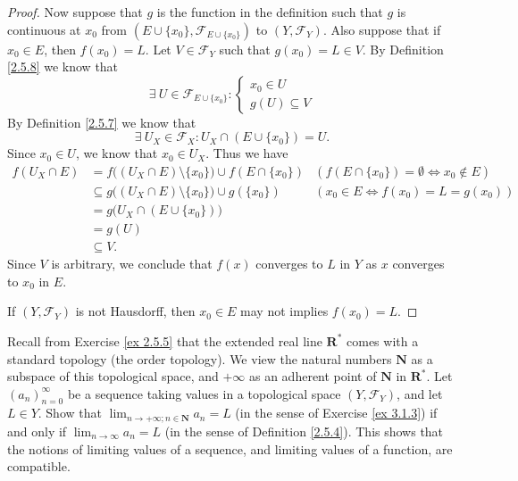 \begin{proof}
    Now suppose that \(g\) is the function in the definition such that \(g\) is continuous at \(x_0\) from \((E \cup \{x_0\}, \mathcal{F}_{E \cup \{x_0\}})\) to \((Y, \mathcal{F}_Y)\).
    Also suppose that if \(x_0 \in E\), then \(f(x_0) = L\).
    Let \(V \in \mathcal{F}_Y\) such that \(g(x_0) = L \in V\).
    By Definition \ref{2.5.8} we know that
    \[
        \exists\ U \in \mathcal{F}_{E \cup \{x_0\}} : \begin{cases}
            x_0 \in U \\
            g(U) \subseteq V
        \end{cases}
    \]
    By Definition \ref{2.5.7} we know that
    \[
        \exists\ U_X \in \mathcal{F}_X : U_X \cap (E \cup \{x_0\}) = U.
    \]
    Since \(x_0 \in U\), we know that \(x_0 \in U_X\).
    Thus we have
    \begin{align*}
        f(U_X \cap E) & = f\big((U_X \cap E) \setminus \{x_0\}\big) \cup f(E \cap \{x_0\})  & (f(E \cap \{x_0\}) = \emptyset \iff x_0 \notin E) \\
                      & \subseteq g\big((U_X \cap E) \setminus \{x_0\}\big) \cup g(\{x_0\}) & (x_0 \in E \iff f(x_0) = L = g(x_0))              \\
                      & = g\big(U_X \cap (E \cup \{x_0\})\big)                                                                                  \\
                      & = g(U)                                                                                                                  \\
                      & \subseteq V.
    \end{align*}
    Since \(V\) is arbitrary, we conclude that \(f(x)\) converges to \(L\) in \(Y\) as \(x\) converges to \(x_0\) in \(E\).

    If \((Y, \mathcal{F}_Y)\) is not Hausdorff, then \(x_0 \in E\) may not implies \(f(x_0) = L\).
\end{proof}

\begin{exercise}\label{ex 3.1.4}
    Recall from Exercise \ref{ex 2.5.5} that the extended real line \(\mathbf{R}^*\) comes with a standard topology (the order topology).
    We view the natural numbers \(\mathbf{N}\) as a subspace of this topological space, and \(+\infty\) as an adherent point of \(\mathbf{N}\) in \(\mathbf{R}^*\).
    Let \((a_n)_{n = 0}^\infty\) be a sequence taking values in a topological space \((Y, \mathcal{F}_Y)\), and let \(L \in Y\).
    Show that \(\lim_{n \to +\infty ; n \in \mathbf{N}} a_n = L\) (in the sense of Exercise \ref{ex 3.1.3}) if and only if \(\lim_{n \to \infty} a_n = L\) (in the sense of Definition \ref{2.5.4}).
    This shows that the notions of limiting values of a sequence, and limiting values of a function, are compatible.
\end{exercise}

